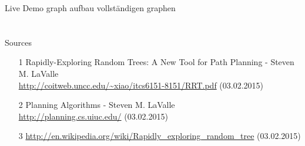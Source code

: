 \documentclass[%
  professionalfonts,%
  xcolor={%
    usenames,%
    dvipsnames,%
    svgnames,%
    table,%
    hyperref%
  }%
]{beamer}
\begin{document}
      \begin{frame}{Live Demo}
        graph aufbau 
        vollständigen graphen
      \end{frame}
        
  \section{}
    \begin{frame}{Sources}
      \begin{itemize}
        \item[1] Rapidly-Exploring Random Trees: A New Tool for Path Planning - Steven M. LaValle 
        \\\url{http://coitweb.uncc.edu/~xiao/itcs6151-8151/RRT.pdf} (03.02.2015)
        \item[2] Planning Algorithms - Steven M. LaValle \\\url{http://planning.cs.uiuc.edu/} (03.02.2015)
        \item[3] \url{http://en.wikipedia.org/wiki/Rapidly_exploring_random_tree} (03.02.2015)
    \end{itemize}
  \end{frame}
  
  \begin{frame}
    \Huge{}
  \end{frame}
\end{document}
